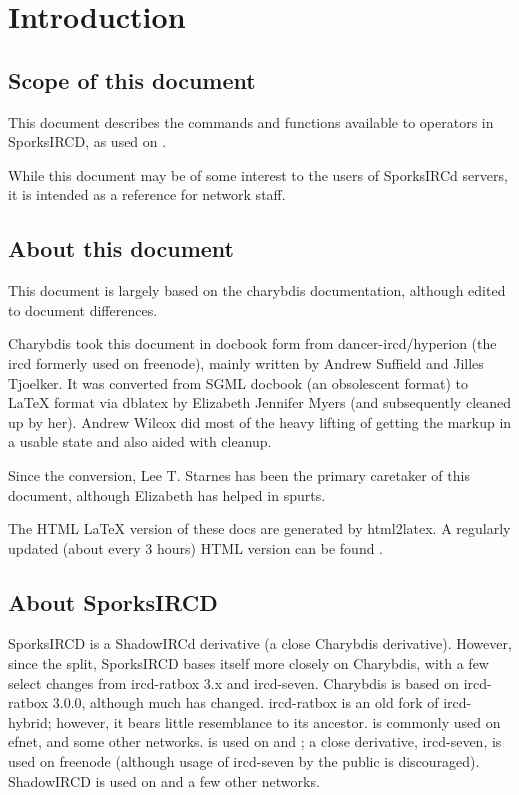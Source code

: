 \chapter{Introduction}
\label{intro}

\section{Scope of this document}
	This document describes the commands and functions available to
	operators in SporksIRCD, as used on
	.

	While this document may be of some interest to the users of SporksIRCd
	servers, it is intended as a reference for network staff.


\section{About this document}
	This document is largely based on the charybdis documentation, although
	edited to document differences.

	Charybdis took this document in docbook form from
	dancer-{}ircd/hyperion (the ircd formerly used on freenode), mainly
	written by Andrew Suffield and Jilles Tjoelker. It was converted from
	SGML docbook (an obsolescent format) to	LaTeX format via dblatex by
	Elizabeth Jennifer Myers (and subsequently cleaned up by her). Andrew
	Wilcox did most of the heavy lifting of getting the markup in a usable
	state and also aided with cleanup.

	Since the conversion, Lee T. Starnes has been the primary caretaker of
	this document, although Elizabeth has helped in spurts.

	The HTML LaTeX version of these docs are generated by html2latex. A
	regularly updated (about every 3 hours) HTML version can be found
	.


\section{About SporksIRCD}
	SporksIRCD is a ShadowIRCd derivative (a close Charybdis derivative).
	However, since the split, SporksIRCD bases itself more closely on
	Charybdis, with a few select changes from ircd-{}ratbox 3.x and
	ircd-{}seven. Charybdis is based on ircd-{}ratbox 3.0.0, although
	much has changed. ircd-{}ratbox is an old fork of ircd-{}hybrid;
	however, it bears little resemblance to its ancestor.
	 is
	commonly used on efnet, and some other networks.
	is used on  and
	; a close
	derivative, ircd-seven, is used on freenode (although usage of
	ircd-seven by the public is discouraged). ShadowIRCD is used on
	 and a few other
	networks.

